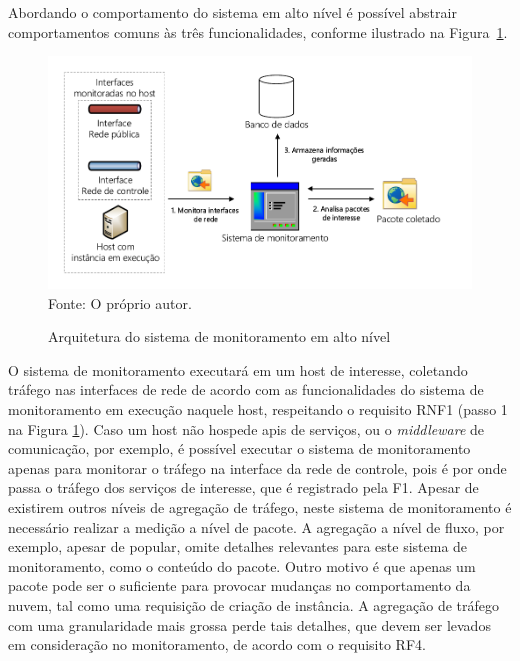 Abordando o comportamento do sistema em alto nível é possível abstrair comportamentos comuns às três funcionalidades, conforme ilustrado na Figura~\ref{fig:proposta_funcionamento}.
%
\begin{figure}[!htb]
	\centering
	\caption{Arquitetura do sistema de monitoramento em alto nível}
    \vspace{-0.5cm}
	\includegraphics[width=1\textwidth]{img/arquitetura_funcionamento.pdf}
	\label{fig:proposta_funcionamento}\\
    \vspace{-0.6cm}
	Fonte: O próprio autor.
\end{figure}

\vspace{-0.3cm}
O sistema de monitoramento executará em um host de interesse, coletando tráfego nas interfaces de rede de acordo com as funcionalidades do sistema de monitoramento em execução naquele host, respeitando o requisito RNF1 (passo 1 na Figura \ref{fig:proposta_funcionamento}).
%
Caso um host não hospede \acp{api} de serviços, ou o \textit{middleware} de comunicação, por exemplo, é possível executar o sistema de monitoramento apenas para monitorar o tráfego na interface da rede de controle, pois é por onde passa o tráfego dos serviços de interesse, que é registrado pela F1.
%
Apesar de existirem outros níveis de agregação de tráfego, neste sistema de monitoramento é necessário realizar a medição a nível de pacote.
%
A agregação a nível de fluxo, por exemplo, apesar de popular, omite detalhes relevantes para este sistema de monitoramento, como o conteúdo do pacote.
%
Outro motivo é que apenas um pacote pode ser o suficiente para provocar mudanças no comportamento da nuvem, tal como uma requisição de criação de instância.
%
A agregação de tráfego com uma granularidade mais grossa perde tais detalhes, que devem ser levados em consideração no monitoramento, de acordo com o requisito RF4.

